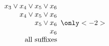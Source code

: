 \documentclass{beamer}
\begin{document}
\begin{frame}
\begin{equation*}
{\begin{array}{r}
x_3 \vee x_4 \vee x_5 \vee x_6\\
x_4 \vee x_5 \vee x_6\\
x_5 \vee x_6\\
x_6\\
\text{all suffixes}\\
\end{array}}
\only<-2>{\phantom{\begin{array}{r}
\\
x_2 \vee x_3 \vee x_4 \vee x_5 \vee x_6\\
x_3 \vee x_4 \vee x_5 \vee x_6\\
x_4 \vee x_5 \vee x_6\\
x_5 \vee x_6\\
x_6\\
\text{all suffixes}\\
\end{array}}}
\end{equation*}

\end{frame}
\end{document}
